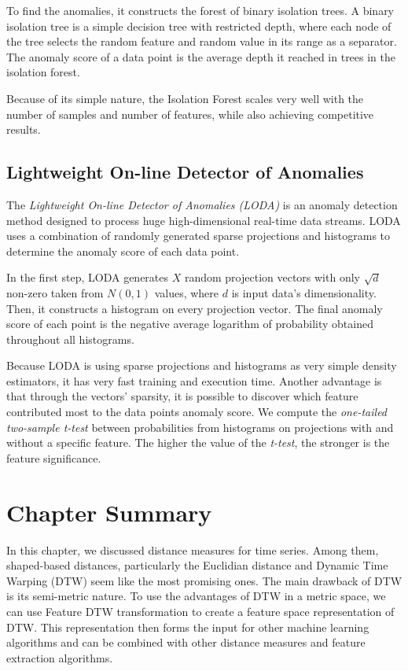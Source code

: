 To find the anomalies, it constructs the forest of binary isolation trees. A binary isolation tree is a simple decision tree with restricted depth, where each node of the tree selects the random feature and random value in its range as a separator. The anomaly score of a data point is the average depth it reached in trees in the isolation forest.

Because of its simple nature, the Isolation Forest scales very well with the number of samples and number of features, while also achieving competitive results.

\subsection{Lightweight On-line Detector of Anomalies}
The \textit{Lightweight On-line Detector of Anomalies (LODA)} is an anomaly detection method designed to process huge high-dimensional real-time data streams. LODA uses a combination of randomly generated sparse projections and histograms to determine the anomaly score of each data point.

In the first step, LODA generates $X$ random projection vectors with only $\sqrt{d}$ non-zero taken from $N(0, 1)$ values, where $d$ is input data's dimensionality. Then, it constructs a histogram on every projection vector. The final anomaly score of each point is the negative average logarithm of probability obtained throughout all histograms.

Because LODA is using sparse projections and histograms as very simple density estimators, it has very fast training and execution time. Another advantage is that through the vectors' sparsity, it is possible to discover which feature contributed most to the data points anomaly score. We compute the \textit{one-tailed two-sample t-test} between probabilities from histograms on projections with and without a specific feature. The higher the value of the \textit{t-test}, the stronger is the feature significance.

\section{Chapter Summary}
In this chapter, we discussed distance measures for time series. Among them, shaped-based distances, particularly the Euclidian distance and Dynamic Time Warping (DTW) seem like the most promising ones. The main drawback of DTW is its semi-metric nature. To use the advantages of DTW in a metric space, we can use Feature DTW transformation to create a feature space representation of DTW. This representation then forms the input for other machine learning algorithms and can be combined with other distance measures and feature extraction algorithms.

